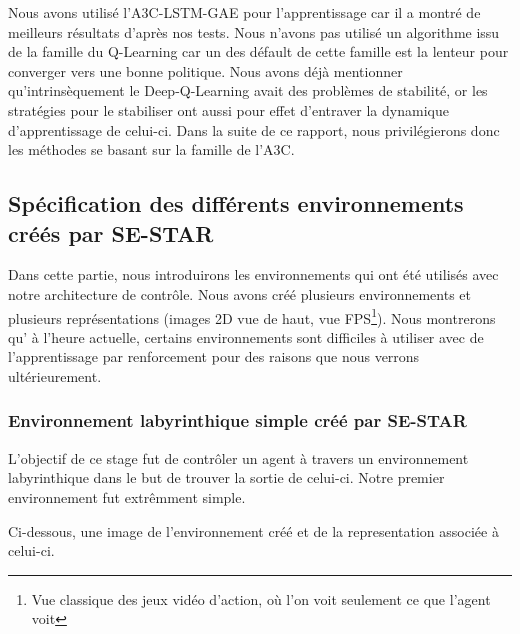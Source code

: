 Nous avons utilisé l'A3C-LSTM-GAE pour l'apprentissage car il a montré de meilleurs résultats d'après nos tests. Nous n'avons pas utilisé un algorithme issu de la famille du Q-Learning car un des défault de cette famille est la lenteur pour converger vers une bonne politique. Nous avons déjà mentionner qu'intrinsèquement le Deep-Q-Learning avait des problèmes de stabilité, or les stratégies pour le stabiliser ont aussi pour effet d'entraver la dynamique d'apprentissage de celui-ci. Dans la suite de ce rapport, nous privilégierons donc les méthodes se basant sur la famille de l'A3C.

\subsection{Spécification des différents environnements créés par SE-STAR}

Dans cette partie, nous introduirons les environnements qui ont été utilisés avec notre architecture de contrôle. Nous avons créé plusieurs environnements et plusieurs représentations (images 2D vue de haut, vue FPS\footnote{Vue classique des jeux vidéo d'action, où l'on voit seulement ce que l'agent voit}). Nous montrerons qu' à l'heure actuelle, certains environnements sont difficiles à utiliser avec de l'apprentissage par renforcement pour des raisons que nous verrons ultérieurement.

\subsubsection{Environnement labyrinthique simple créé par SE-STAR}

L'objectif de ce stage fut de contrôler un agent à travers un environnement labyrinthique dans le but de trouver la sortie de celui-ci. Notre premier environnement fut extrêmment simple. 

Ci-dessous, une image de l'environnement créé et de la representation associée à celui-ci.


